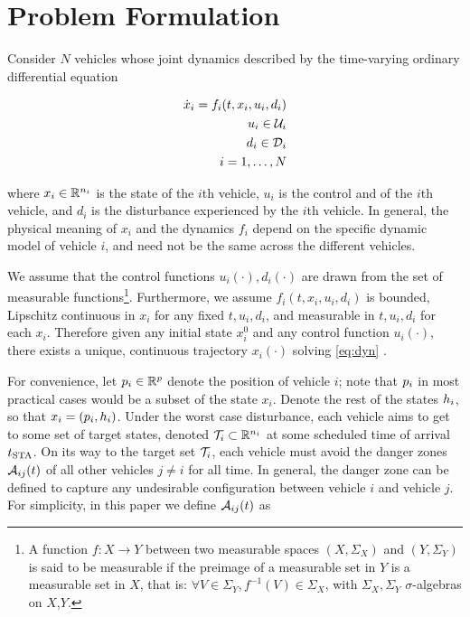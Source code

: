 \section{Problem Formulation \label{sec:formulation}}
Consider $N$ vehicles whose joint dynamics described by the time-varying ordinary differential equation

\begin{equation}
\label{eq:dyn}
\begin{aligned}
\dot{x}_i = f_i(t, x_i, u_i, d_i) \\
u_i \in \mathcal{U}_i \\
d_i \in \mathcal{D}_i \\
i = 1,\ldots, N
\end{aligned}
\end{equation}

where $x_i \in \mathbb{R}^{n_i}$ is the state of the $i$th vehicle, $u_i$ is the control and of the $i$th vehicle, and $d_i$ is the disturbance experienced by the $i$th vehicle. In general, the physical meaning of $x_i$ and the dynamics $f_i$ depend on the specific dynamic model of vehicle $i$, and need not be the same across the different vehicles. 

We assume that the control functions $u_i(\cdot), d_i(\cdot)$ are drawn from the set of measurable functions\footnote{
A function $f:X\to Y$ between two measurable spaces $(X,\Sigma_X)$ and $(Y,\Sigma_Y)$ is said to be measurable if the preimage of a measurable set in $Y$ is a measurable set in $X$, that is: $\forall V\in\Sigma_Y, f^{-1}(V)\in\Sigma_X$, with $\Sigma_X,\Sigma_Y$ $\sigma$-algebras on $X$,$Y$.}. Furthermore, we assume $f_i(t,x_i, u_i, d_i)$ is bounded, Lipschitz continuous in $x_i$ for any fixed $t, u_i, d_i$, and measurable in $t, u_i, d_i$ for each $x_i$. Therefore given any initial state $x_i^0$ and any control function $u_i(\cdot)$, there exists a unique, continuous trajectory $x_i(\cdot)$ solving \eqref{eq:dyn} \cite{Coddington55}.

For convenience, let $p_i \in \mathbb{R}^p$ denote the position of vehicle $i$; note that $p_i$ in most practical cases would be a subset of the state $x_i$. Denote the rest of the states $h_i$, so that $x_i = (p_i, h_i)$. Under the worst case disturbance, each vehicle aims to get to some set of target states, denoted $\mathcal{T}_i \subset \mathbb{R}^{n_i}$ at some scheduled time of arrival $t_\text{STA}$. On its way to the target set $\mathcal{T}_i$, each vehicle must avoid the danger zones $\mathcal{A}_{ij}(t)$ of all other vehicles $j\neq i$ for all time. In general, the danger zone can be defined to capture any undesirable configuration between vehicle $i$ and vehicle $j$. For simplicity, in this paper we define $\mathcal{A}_{ij}(t)$ as

